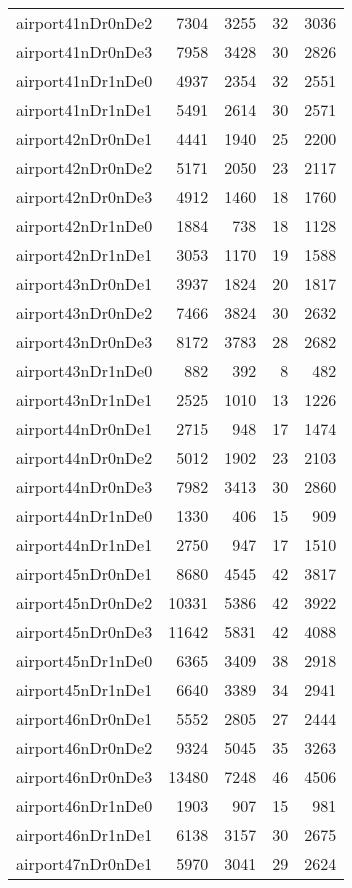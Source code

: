 \begin{longtable}{lrrrr}
airport41nDr0nDe2 & 7304 & 3255 & 32 & 3036 \\
airport41nDr0nDe3 & 7958 & 3428 & 30 & 2826 \\
airport41nDr1nDe0 & 4937 & 2354 & 32 & 2551 \\
airport41nDr1nDe1 & 5491 & 2614 & 30 & 2571 \\
airport42nDr0nDe1 & 4441 & 1940 & 25 & 2200 \\
airport42nDr0nDe2 & 5171 & 2050 & 23 & 2117 \\
airport42nDr0nDe3 & 4912 & 1460 & 18 & 1760 \\
airport42nDr1nDe0 & 1884 & 738 & 18 & 1128 \\
airport42nDr1nDe1 & 3053 & 1170 & 19 & 1588 \\
airport43nDr0nDe1 & 3937 & 1824 & 20 & 1817 \\
airport43nDr0nDe2 & 7466 & 3824 & 30 & 2632 \\
airport43nDr0nDe3 & 8172 & 3783 & 28 & 2682 \\
airport43nDr1nDe0 & 882 & 392 & 8 & 482 \\
airport43nDr1nDe1 & 2525 & 1010 & 13 & 1226 \\
airport44nDr0nDe1 & 2715 & 948 & 17 & 1474 \\
airport44nDr0nDe2 & 5012 & 1902 & 23 & 2103 \\
airport44nDr0nDe3 & 7982 & 3413 & 30 & 2860 \\
airport44nDr1nDe0 & 1330 & 406 & 15 & 909 \\
airport44nDr1nDe1 & 2750 & 947 & 17 & 1510 \\
airport45nDr0nDe1 & 8680 & 4545 & 42 & 3817 \\
airport45nDr0nDe2 & 10331 & 5386 & 42 & 3922 \\
airport45nDr0nDe3 & 11642 & 5831 & 42 & 4088 \\
airport45nDr1nDe0 & 6365 & 3409 & 38 & 2918 \\
airport45nDr1nDe1 & 6640 & 3389 & 34 & 2941 \\
airport46nDr0nDe1 & 5552 & 2805 & 27 & 2444 \\
airport46nDr0nDe2 & 9324 & 5045 & 35 & 3263 \\
airport46nDr0nDe3 & 13480 & 7248 & 46 & 4506 \\
airport46nDr1nDe0 & 1903 & 907 & 15 & 981 \\
airport46nDr1nDe1 & 6138 & 3157 & 30 & 2675 \\
airport47nDr0nDe1 & 5970 & 3041 & 29 & 2624 \\

\end{longtable}
